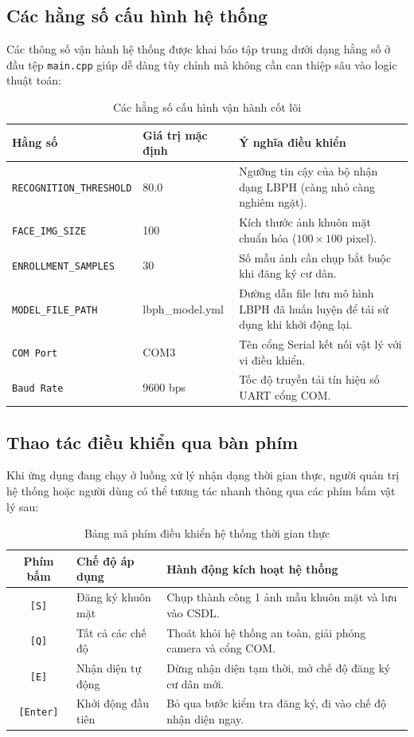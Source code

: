 \documentclass[12pt,a4paper]{article}
\begin{document}
\subsection{Các hằng số cấu hình hệ thống}
Các thông số vận hành hệ thống được khai báo tập trung dưới dạng hằng số ở đầu tệp \texttt{main.cpp} giúp dễ dàng tùy chỉnh mà không cần can thiệp sâu vào logic thuật toán:
\begin{table}[H]
    \centering
    \begin{tabular}{|l|l|p{7.5cm}|}
        \hline
        \textbf{Hằng số} & \textbf{Giá trị mặc định} & \textbf{Ý nghĩa điều khiển} \\ \hline
        \texttt{RECOGNITION\_THRESHOLD} & 80.0 & Ngưỡng tin cậy của bộ nhận dạng LBPH (càng nhỏ càng nghiêm ngặt). \\ \hline
        \texttt{FACE\_IMG\_SIZE} & 100 & Kích thước ảnh khuôn mặt chuẩn hóa ($100 \times 100$ pixel). \\ \hline
        \texttt{ENROLLMENT\_SAMPLES} & 30 & Số mẫu ảnh cần chụp bắt buộc khi đăng ký cư dân. \\ \hline
        \texttt{MODEL\_FILE\_PATH} & lbph\_model.yml & Đường dẫn file lưu mô hình LBPH đã huấn luyện để tái sử dụng khi khởi động lại. \\ \hline
        \texttt{COM Port} & COM3 & Tên cổng Serial kết nối vật lý với vi điều khiển. \\ \hline
        \texttt{Baud Rate} & 9600 bps & Tốc độ truyền tải tín hiệu số UART cổng COM. \\ \hline
    \end{tabular}
    \caption{Các hằng số cấu hình vận hành cốt lõi}
    \label{tab:constants}
\end{table}

\subsection{Thao tác điều khiển qua bàn phím}
Khi ứng dụng đang chạy ở luồng xử lý nhận dạng thời gian thực, người quản trị hệ thống hoặc người dùng có thể tương tác nhanh thông qua các phím bấm vật lý sau:
\begin{table}[H]
    \centering
    \begin{tabular}{|c|l|p{9cm}|}
        \hline
        \textbf{Phím bấm} & \textbf{Chế độ áp dụng} & \textbf{Hành động kích hoạt hệ thống} \\ \hline
        \texttt{[S]} & Đăng ký khuôn mặt & Chụp thành công 1 ảnh mẫu khuôn mặt và lưu vào CSDL. \\ \hline
        \texttt{[Q]} & Tất cả các chế độ & Thoát khỏi hệ thống an toàn, giải phóng camera và cổng COM. \\ \hline
        \texttt{[E]} & Nhận diện tự động & Dừng nhận diện tạm thời, mở chế độ đăng ký cư dân mới. \\ \hline
        \texttt{[Enter]} & Khởi động đầu tiên & Bỏ qua bước kiểm tra đăng ký, đi vào chế độ nhận diện ngay. \\ \hline
    \end{tabular}
    \caption{Bảng mã phím điều khiển hệ thống thời gian thực}
    \label{tab:keyboard_actions}
\end{table}
\end{document}

